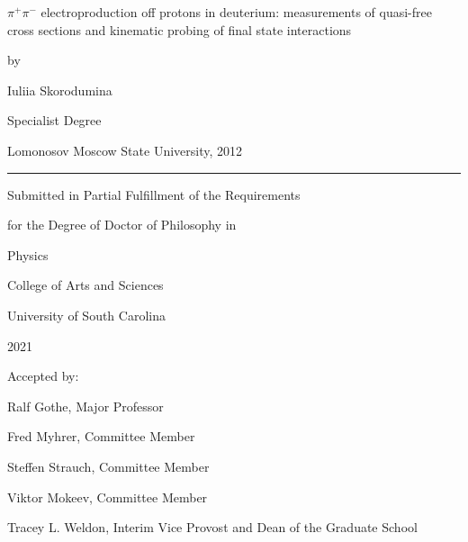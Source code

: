 \thispagestyle{empty}

\begin{center}
\vspace*{\fill}

\singlespacing

{\Large $\pi^{+}\pi^{-}$ electroproduction off protons in deuterium: measurements of quasi-free cross sections and kinematic probing of final state interactions }


\doublespacing
\vspace{\baselineskip}
by

\vspace{\baselineskip}
Iuliia Skorodumina  

\vspace{\baselineskip}
\singlespacing
Specialist Degree

Lomonosov Moscow State University, 2012

\doublespacing

\vspace{\baselineskip}
\rule{0.5\paperwidth}{0.4pt}
\vspace{\baselineskip}

Submitted in Partial Fulfillment of the Requirements

for the Degree of Doctor of Philosophy in

Physics

College of Arts and Sciences

University of South Carolina

2021

Accepted by:

Ralf Gothe, Major Professor

Fred Myhrer, Committee Member

Steffen Strauch, Committee Member

Viktor Mokeev, Committee Member

Tracey L. Weldon, Interim Vice Provost and Dean of the Graduate School
\vspace*{\fill}
\end{center}


